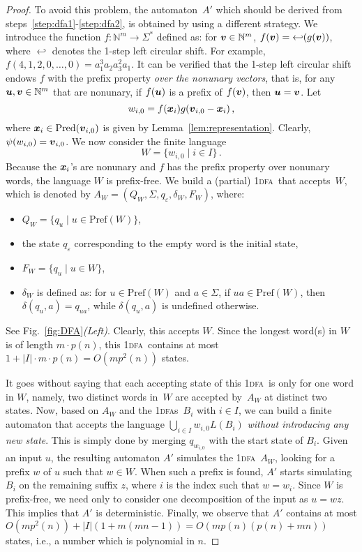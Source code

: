 \documentclass[11pt]{article}
\newcommand*{\ow}{\textsc{1}}
\newcommand*{\owdfa}{\ow\textsc{dfa}}
\newcommand*{\owdfas}{\ow\textsc{dfa}s}
\newcommand{\Pred}{\ensuremath{\mathrm{Pred}}}
\newcommand{\Pref}{\ensuremath{\mathrm{Pref}}}
\def\Vec#1{\mbox{\boldmath $#1$}}
\begin{document}
\begin{proof}
To avoid this problem, the automaton~$A'$ which should be derived from steps~\ref{step:dfa1}-\ref{step:dfa2},
is obtained by using a different strategy.
We introduce the function $f: \mathbb{N}^m \to \Sigma^*$ defined as: for $\Vec{v} \in \mathbb{N}^m$, $f(\Vec{v}) = \mbox{$\hookleftarrow$}(g(\Vec{v}))$, where $\hookleftarrow$ denotes the 1-step left circular shift. 
For example, $f(4, 1, 2, 0, \ldots, 0) = a_1^3 a_2 a_3^2 a_1$.
It can be verified that the 1-step left circular shift endows $f$ with the prefix property {\it over the nonunary vectors}, that is, for any $\Vec{u}, \Vec{v} \in \mathbb{N}^m$ that are nonunary, if $f(\Vec{u})$ is a prefix of $f(\Vec{v})$, then $\Vec{u} = \Vec{v}$. 
Let 
\[
w_{i, 0} = f(\Vec{x}_i) g(\Vec{v}_{i, 0} - \Vec{x}_i)\,,
\] 
where $\Vec{x}_i\in\Pred(\Vec{v}_{i, 0})$ is given by Lemma~\ref{lem:representation}.
Clearly, $\psi(w_{i, 0})=\Vec{v}_{i, 0}$.
We now consider the finite language
\[
W = \{w_{i, 0} \mid i \in I\}\,.
\]
Because the $\Vec{x}_{i}$'s are nonunary and $f$ has the prefix property over nonunary words,
the language $W$ is prefix-free. 
We build a (partial) \owdfa\ that accepts~$W$\!, which is denoted by $A_W = (Q_W, \Sigma, q_\varepsilon, \delta_W, F_W)$, where:
\begin{itemize}
\item $Q_W = \{q_u \mid u \in \Pref(W)\}$,
\item the state $q_\varepsilon$ corresponding to the empty word is the initial state,
\item $F_W = \{q_u \mid u \in W\}$,
\item $\delta_W$ is defined as: for $u \in \Pref(W)$ and $a \in \Sigma$, if $ua \in \Pref(W)$, then $\delta(q_u, a) = q_{ua}$, while $\delta(q_u, a)$ is undefined otherwise.
\end{itemize}
See Fig.~\ref{fig:DFA}\emph{(Left)}. 
Clearly, this accepts $W$\!. 
Since the longest word(s) in $W$ is of length $m\cdot p(n)$, this \owdfa\ contains at most 
$1+|I| \cdot m \cdot p(n)=O(mp^2(n))$ states.

It goes without saying that each accepting state of this \owdfa\ is only for one word in $W$\!,
namely, two distinct words in~$W$ are accepted by~$A_W$ at distinct two states. 
Now, based on $A_W$ and the \owdfas\ $B_i$ with $i \in I$, we can build a finite automaton that accepts the language $\bigcup_{i \in I} w_{i, 0} L(B_i)$ {\it without introducing any new state}. 
This is simply done by merging $q_{w_{i, 0}}$ with the start state of $B_i$. 
Given an input $u$, the resulting automaton $A'$ simulates the \owdfa\ $A_W$, looking for a prefix $w$ of $u$ such that $w \in W$\!. 
When such a prefix is found, $A'$ starts simulating $B_i$ on the remaining suffix $z$, where $i$ is the index such that $w = w_i$. 
Since $W$ is prefix-free, we need only to consider one decomposition of the input as $u = wz$. 
This implies that $A'$ is deterministic. 
Finally, we observe that
$A'$ contains at most $O(mp^2(n))+ |I| (1+ m(mn-1))=O(mp(n)(p(n)+mn))$ states, i.e.,
a number which is polynomial in $n$.


\end{proof}
\end{document}
